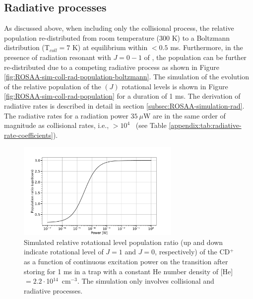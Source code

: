 \clearpage

\subsection{Radiative processes}
\label{subsec:CD+-kinetics-simulation-coll-rad}

As discussed above, when including only the collisional process, the relative
population re-distributed from room temperature (300 K) to a Boltzmann
distribution (T$_{coll}=7$ K) at equilibrium within $<0.5$ ms. Furthermore, in
the presence of radiation resonant with $J=0-1$ of \CD, the population can be
further re-distributed due to a competing radiative process as shown in Figure
\ref{fig:ROSAA-sim-coll-rad-population-boltzmann}. The simulation of the
evolution of the relative population of the \CD$(J)$ rotational levels is shown
in Figure \ref{fig:ROSAA-sim-coll-rad-population} for a duration of 1 ms. The
derivation of radiative rates is described in detail in section
\ref{subsec:ROSAA-simulation-rad}. The radiative rates for a radiation power $35\ \mu$W are
in the same order of magnitude as collisional rates, i.e., $>10^{4}$ \pers\
(see Table \ref{appendix:tab:radiative-rate-coefficients}).



\begin{figure}[!htb]
    \centering
    \includegraphics[width=0.7\textwidth]{figures/measurements/kinetics/CD+_power_saturation_up_down.pdf}
    \caption{
        Simulated relative rotational level population ratio (up and down indicate rotational level 
        of $J=1$ and $J=0$, respectively) of the CD$^+$ as a function of continuous excitation 
        power on the \CDline transition after storing for 1 ms in a trap with a constant 
        He number density of [He]$= 2.2\cdot$10$^{14}$~cm$^{-3}$. 
        The simulation only involves collisional and radiative processes.
    }
    \label{fig:pop_ratio_vs_power}
\end{figure}


